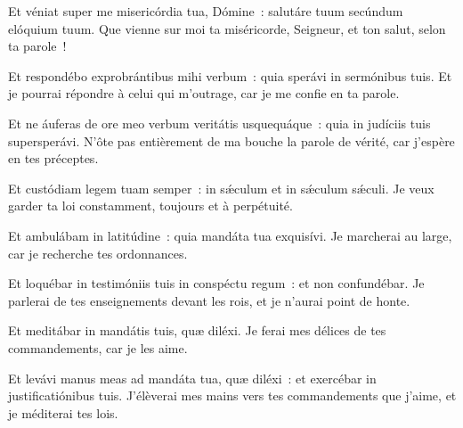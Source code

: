 \begin{paracol}{2}

\LigneParacol{0cm}
{Et véniat super me misericórdia tua, Dómine~: \GreStar{} salutáre tuum secúndum elóquium tuum.}
{Que vienne sur moi ta miséricorde, Seigneur, et ton salut, selon ta parole~!}

\LigneParacol{0.2cm}
{Et respondébo exprobrántibus mihi verbum~: \GreStar{} quia sperávi in sermónibus tuis.}
{Et je pourrai répondre à celui qui m'outrage, car je me confie en ta parole.}

\LigneParacol{0.2cm}
{Et ne áuferas de ore meo verbum veritátis usquequáque~: \GreStar{} quia in judíciis tuis supersperávi.}
{N'ôte pas entièrement de ma bouche la parole de vérité, car j'espère en tes préceptes.}

\LigneParacol{0.2cm}
{Et custódiam legem tuam semper~: \GreStar{} in sǽculum et in sǽculum sǽculi.}
{Je veux garder ta loi constamment, toujours et à perpétuité.}

\LigneParacol{0.2cm}
{Et ambulábam in latitúdine~: \GreStar{} quia mandáta tua exquisívi.}
{Je marcherai au large, car je recherche tes ordonnances.}

\LigneParacol{0.2cm}
{Et loquébar in testimóniis tuis in conspéctu regum~: \GreStar{} et non confundébar.}
{Je parlerai de tes enseignements devant les rois, et je n'aurai point de honte.}

\LigneParacol{0.2cm}
{Et meditábar in mandátis tuis, \GreStar{} quæ diléxi.}
{Je ferai mes délices de tes commandements, car je les aime.}

\LigneParacol{0.2cm}
{Et levávi manus meas ad mandáta tua, quæ diléxi~: \GreStar{} et exercébar in justificatiónibus tuis.}
{J'élèverai mes mains vers tes commandements que j'aime, et je méditerai tes lois. }

\end{paracol}
\Gloria

